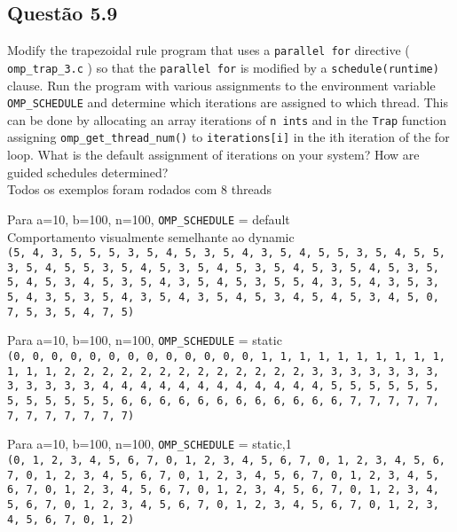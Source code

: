 
\subsection{Questão 5.9}

Modify the trapezoidal rule program that uses a \texttt{parallel for} directive ( \texttt{omp\_trap\_3.c} ) so that the \texttt{parallel for} is modified by a \texttt{schedule(runtime)} clause. Run the program with various assignments to the environment variable \texttt{OMP\_SCHEDULE} and determine which iterations are assigned to which thread. This can be done by allocating an array iterations of \texttt{n ints} and in the \texttt{Trap} function assigning \texttt{omp\_get\_thread\_num()} to \texttt{iterations[i]} in the ith iteration of the for loop. What is the default assignment of iterations on your system? How are guided schedules determined?\\

Todos os exemplos foram rodados com 8 threads

Para a=10, b=100, n=100, \texttt{OMP\_SCHEDULE} = default \\
Comportamento visualmente semelhante ao dynamic \\
\texttt{(5, 4, 3, 5, 5, 5, 3, 5, 4, 5, 3, 5, 4, 3, 5, 4, 5, 5, 3, 5, 4, 5, 5, 3, 5, 4, 5, 5, 3, 5, 4, 5, 3, 5, 4, 5, 3, 5, 4, 5, 3, 5, 4, 5, 3, 5, 5, 4, 5, 3, 4, 5, 3, 5, 4, 3, 5, 4, 5, 3, 5, 5, 4, 3, 5, 4, 3, 5, 3, 5, 4, 3, 5, 3, 5, 4, 3, 5, 4, 3, 5, 4, 5, 3, 4, 5, 4, 5, 3, 4, 5, 0, 7, 5, 3, 5, 4, 7, 5)}

Para a=10, b=100, n=100, \texttt{OMP\_SCHEDULE} = static \\
\texttt{(0, 0, 0, 0, 0, 0, 0, 0, 0, 0, 0, 0, 0, 1, 1, 1, 1, 1, 1, 1, 1, 1, 1, 1, 1, 1, 2, 2, 2, 2, 2, 2, 2, 2, 2, 2, 2, 2, 2, 3, 3, 3, 3, 3, 3, 3, 3, 3, 3, 3, 3, 4, 4, 4, 4, 4, 4, 4, 4, 4, 4, 4, 4, 5, 5, 5, 5, 5, 5, 5, 5, 5, 5, 5, 5, 6, 6, 6, 6, 6, 6, 6, 6, 6, 6, 6, 6, 7, 7, 7, 7, 7, 7, 7, 7, 7, 7, 7, 7)}

Para a=10, b=100, n=100, \texttt{OMP\_SCHEDULE} = static,1 \\
\texttt{(0, 1, 2, 3, 4, 5, 6, 7, 0, 1, 2, 3, 4, 5, 6, 7, 0, 1, 2, 3, 4, 5, 6, 7, 0, 1, 2, 3, 4, 5, 6, 7, 0, 1, 2, 3, 4, 5, 6, 7, 0, 1, 2, 3, 4, 5, 6, 7, 0, 1, 2, 3, 4, 5, 6, 7, 0, 1, 2, 3, 4, 5, 6, 7, 0, 1, 2, 3, 4, 5, 6, 7, 0, 1, 2, 3, 4, 5, 6, 7, 0, 1, 2, 3, 4, 5, 6, 7, 0, 1, 2, 3, 4, 5, 6, 7, 0, 1, 2)}

